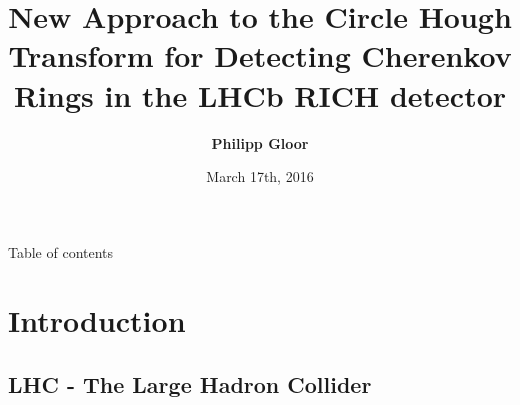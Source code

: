 \documentclass[10pt, xcolor={table}]{beamer}
\author{\textbf{Philipp Gloor}}
\title[Circle Hough transform]{New Approach to the Circle Hough
Transform for Detecting Cherenkov
Rings in the LHCb RICH detector
}
\date{March 17th, 2016}
\institute[]{Physik Institut,\\[1em] 
University of Zurich\\[2em]
\texttt{[image: pics/cat]}
}
\begin{document}

\thispagestyle{empty}
\begin{frame}
  \transsplithorizontalout
  \titlepage
\end{frame}



\begin{frame}[allowframebreaks]{Table of contents}
\tableofcontents
\end{frame}

\section{Introduction}
\subsection{LHC - The Large Hadron Collider} %
\end{document}
